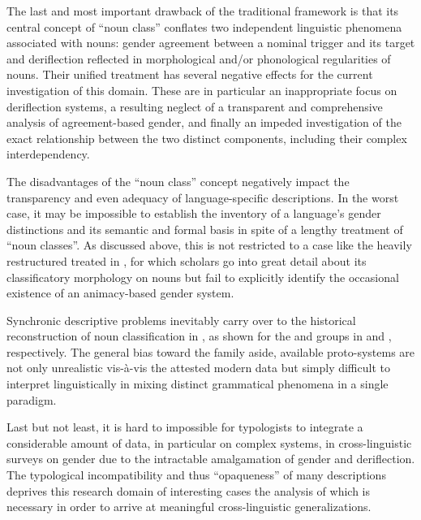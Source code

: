 \documentclass[output=collectionpaper]{langsci/langscibook}
\begin{document}
The last and most important drawback of the traditional  framework is that its central concept of ``noun class'' conflates two independent linguistic phenomena associated with nouns: gender agreement between a nominal trigger and its target and deriflection reflected in morphological and/or phonological regularities of nouns. Their unified treatment has several negative effects for the current investigation of this domain. These are in particular an inappropriate focus on deriflection systems, a resulting neglect of a transparent and comprehensive analysis of agreement-based gender, and finally an impeded investigation of the exact relationship between the two distinct components, including their complex interdependency.

The disadvantages of the ``noun class'' concept negatively impact the transparency and even adequacy of language-specific descriptions. In the worst case, it may be impossible to establish the inventory of a language's gender distinctions and its semantic and formal basis in spite of a lengthy treatment of ``noun classes''. As discussed above, this is not restricted to a case like the heavily restructured  treated in , for which scholars go into great detail about its classificatory morphology on nouns but fail to explicitly identify the occasional existence of an animacy-based gender system.

Synchronic descriptive problems inevitably carry over to the historical reconstruction of noun classification in , as shown for the  and  groups in  and , respectively. The general bias toward the  family aside, available proto-systems are not only unrealistic vis-à-vis the attested modern data but simply difficult to interpret linguistically in mixing distinct grammatical phenomena in a single paradigm.

Last but not least, it is hard to impossible for typologists to integrate a considerable amount of  data, in particular on complex systems, in cross-linguistic surveys on gender due to the intractable amalgamation of gender and deriflection. The typological incompatibility and thus ``opaqueness'' of many  descriptions deprives this research domain of interesting cases the analysis of which is necessary in order to arrive at meaningful cross-linguistic generalizations.
\end{document}
